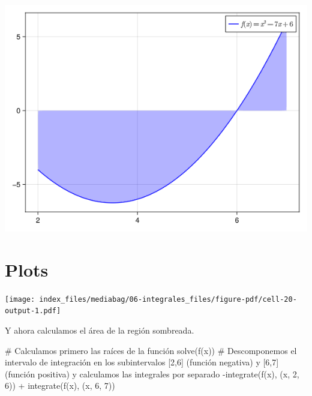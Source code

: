 \documentclass[
  a4paper,
]{scrreport}
\newenvironment{Shaded}{\begin{snugshade}}{\end{snugshade}}
\newcommand{\BuiltInTok}[1]{\textcolor[rgb]{0.00,0.23,0.31}{#1}}
\newcommand{\CommentTok}[1]{\textcolor[rgb]{0.37,0.37,0.37}{#1}}
\newcommand{\DataTypeTok}[1]{\textcolor[rgb]{0.68,0.00,0.00}{#1}}
\newcommand{\FloatTok}[1]{\textcolor[rgb]{0.68,0.00,0.00}{#1}}
\newcommand{\FunctionTok}[1]{\textcolor[rgb]{0.28,0.35,0.67}{#1}}
\newcommand{\ImportTok}[1]{\textcolor[rgb]{0.00,0.46,0.62}{#1}}
\newcommand{\NormalTok}[1]{\textcolor[rgb]{0.00,0.23,0.31}{#1}}
\newcommand{\OperatorTok}[1]{\textcolor[rgb]{0.37,0.37,0.37}{#1}}
\newcommand{\PreprocessorTok}[1]{\textcolor[rgb]{0.68,0.00,0.00}{#1}}
\newcommand{\SpecialCharTok}[1]{\textcolor[rgb]{0.37,0.37,0.37}{#1}}
\newcommand{\StringTok}[1]{\textcolor[rgb]{0.13,0.47,0.30}{#1}}
\theoremstyle{definition}
\theoremstyle{remark}
\begin{document}
\begin{tcolorbox}
\includegraphics{06-integrales_files/figure-pdf/cell-19-output-1.png}

\section{Plots}

\begin{Shaded}
\end{Shaded}

\texttt{[image: index\_files/mediabag/06-integrales\_files/figure-pdf/cell-20-output-1.pdf]}

Y ahora calculamos el área de la región sombreada.

\begin{Shaded}
\begin{Highlighting}[]
\CommentTok{\# Calculamos primero las raíces de la función}
\FunctionTok{solve}\NormalTok{(}\FunctionTok{f}\NormalTok{(x))}
\CommentTok{\# Descomponemos el intervalo de integración en los subintervalos [2,6] (función negativa) y [6,7] (función positiva) y calculamos las integrales por separado}
\FunctionTok{{-}integrate}\NormalTok{(}\FunctionTok{f}\NormalTok{(x), (x, }\FloatTok{2}\NormalTok{, }\FloatTok{6}\NormalTok{)) }\OperatorTok{+} \FunctionTok{integrate}\NormalTok{(}\FunctionTok{f}\NormalTok{(x), (x, }\FloatTok{6}\NormalTok{, }\FloatTok{7}\NormalTok{))}
\end{Highlighting}
\end{Shaded}


\end{tcolorbox}
\end{document}
